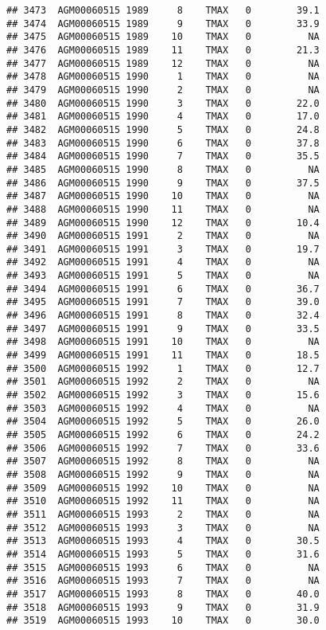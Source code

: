 \documentclass{article}\usepackage[]{graphicx}\usepackage[]{color}
\makeatletter
\newenvironment{kframe}{%
 \def\at@end@of@kframe{}%
 \ifinner\ifhmode%
  \def\at@end@of@kframe{\end{minipage}}%
  \begin{minipage}{\columnwidth}%
 \fi\fi%
 \def\FrameCommand##1{\hskip\@totalleftmargin \hskip-\fboxsep
 \colorbox{shadecolor}{##1}\hskip-\fboxsep
     \hskip-\linewidth \hskip-\@totalleftmargin \hskip\columnwidth}%
 \MakeFramed {\advance\hsize-\width
   \@totalleftmargin\z@ \linewidth\hsize
   \@setminipage}}%
 {\par\unskip\endMakeFramed%
 \at@end@of@kframe}
\newenvironment{knitrout}{}{} %
\makeatother
\begin{document}
\begin{knitrout}
\begin{kframe}
\begin{verbatim}
## 3473  AGM00060515 1989     8    TMAX   0        39.1
## 3474  AGM00060515 1989     9    TMAX   0        33.9
## 3475  AGM00060515 1989    10    TMAX   0          NA
## 3476  AGM00060515 1989    11    TMAX   0        21.3
## 3477  AGM00060515 1989    12    TMAX   0          NA
## 3478  AGM00060515 1990     1    TMAX   0          NA
## 3479  AGM00060515 1990     2    TMAX   0          NA
## 3480  AGM00060515 1990     3    TMAX   0        22.0
## 3481  AGM00060515 1990     4    TMAX   0        17.0
## 3482  AGM00060515 1990     5    TMAX   0        24.8
## 3483  AGM00060515 1990     6    TMAX   0        37.8
## 3484  AGM00060515 1990     7    TMAX   0        35.5
## 3485  AGM00060515 1990     8    TMAX   0          NA
## 3486  AGM00060515 1990     9    TMAX   0        37.5
## 3487  AGM00060515 1990    10    TMAX   0          NA
## 3488  AGM00060515 1990    11    TMAX   0          NA
## 3489  AGM00060515 1990    12    TMAX   0        10.4
## 3490  AGM00060515 1991     2    TMAX   0          NA
## 3491  AGM00060515 1991     3    TMAX   0        19.7
## 3492  AGM00060515 1991     4    TMAX   0          NA
## 3493  AGM00060515 1991     5    TMAX   0          NA
## 3494  AGM00060515 1991     6    TMAX   0        36.7
## 3495  AGM00060515 1991     7    TMAX   0        39.0
## 3496  AGM00060515 1991     8    TMAX   0        32.4
## 3497  AGM00060515 1991     9    TMAX   0        33.5
## 3498  AGM00060515 1991    10    TMAX   0          NA
## 3499  AGM00060515 1991    11    TMAX   0        18.5
## 3500  AGM00060515 1992     1    TMAX   0        12.7
## 3501  AGM00060515 1992     2    TMAX   0          NA
## 3502  AGM00060515 1992     3    TMAX   0        15.6
## 3503  AGM00060515 1992     4    TMAX   0          NA
## 3504  AGM00060515 1992     5    TMAX   0        26.0
## 3505  AGM00060515 1992     6    TMAX   0        24.2
## 3506  AGM00060515 1992     7    TMAX   0        33.6
## 3507  AGM00060515 1992     8    TMAX   0          NA
## 3508  AGM00060515 1992     9    TMAX   0          NA
## 3509  AGM00060515 1992    10    TMAX   0          NA
## 3510  AGM00060515 1992    11    TMAX   0          NA
## 3511  AGM00060515 1993     2    TMAX   0          NA
## 3512  AGM00060515 1993     3    TMAX   0          NA
## 3513  AGM00060515 1993     4    TMAX   0        30.5
## 3514  AGM00060515 1993     5    TMAX   0        31.6
## 3515  AGM00060515 1993     6    TMAX   0          NA
## 3516  AGM00060515 1993     7    TMAX   0          NA
## 3517  AGM00060515 1993     8    TMAX   0        40.0
## 3518  AGM00060515 1993     9    TMAX   0        31.9
## 3519  AGM00060515 1993    10    TMAX   0        30.0

\end{verbatim}
\end{kframe}
\end{knitrout}
\end{document}
